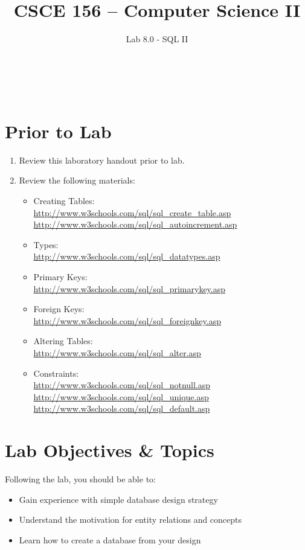 \documentclass[12pt]{scrartcl}
\title{CSCE 156 -- Computer Science II}
\subtitle{Lab 8.0 - SQL II}
\author{~}
\date{~}
\begin{document}
\maketitle

\section*{Prior to Lab}

\begin{enumerate}
  \item Review this laboratory handout prior to lab.
  \item Review the following materials:
  \begin{itemize}
    \item Creating Tables: \\
    \url{http://www.w3schools.com/sql/sql_create_table.asp}\\
    \url{http://www.w3schools.com/sql/sql_autoincrement.asp}
    \item Types: \\
    \url{http://www.w3schools.com/sql/sql_datatypes.asp}
    \item Primary Keys: \\
    \url{http://www.w3schools.com/sql/sql_primarykey.asp}
    \item Foreign Keys: \\
    \url{http://www.w3schools.com/sql/sql_foreignkey.asp}
    \item Altering Tables: \\
    \url{http://www.w3schools.com/sql/sql_alter.asp}
    \item Constraints: \\
    \url{http://www.w3schools.com/sql/sql_notnull.asp}\\
    \url{http://www.w3schools.com/sql/sql_unique.asp}\\
	\url{http://www.w3schools.com/sql/sql_default.asp}
  \end{itemize}  
\end{enumerate}

\section*{Lab Objectives \& Topics}
Following the lab, you should be able to:
\begin{itemize}
  \item Gain experience with simple database design strategy
  \item Understand the motivation for entity relations and concepts
  \item Learn how to create a database from your design
\end{itemize}
\end{document}
